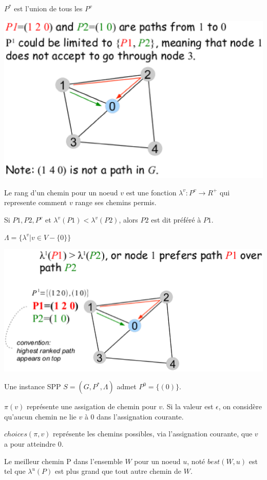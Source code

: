 \documentclass{report}
\begin{document}
$P^*$ est l'union de tous les $P^v$

\includegraphics[width=\textwidth]{sppex2.eps}

Le rang d'un chemin pour un noeud $v$ est une fonction $\lambda^v :
P^v \rightarrow R^+$ qui represente comment $v$ range ses chemins
permis.

Si $P1, P2, P^v$ et $\lambda^v(P1) < \lambda^v(P2)$, alors $P2$ est
dit préféré à $P1$.

$\Lambda = \{\lambda^v | v \in V-\{0\}\}$

\includegraphics[width=\textwidth]{sppex3.eps}

Une instance SPP $S = (G, P^*, \Lambda)$ admet $P^0=\{(0)\}$.

$\pi(v)$ représente une assigation de chemin pour $v$. Si la valeur
est $\epsilon$, on considère qu'aucun chemin ne lie $v$ à $0$ dans
l'assignation courante.

$choices(\pi, v)$ représente les chemins possibles, via l'assignation
courante, que $v$ a pour atteindre $0$.

Le meilleur chemin P dans l'ensemble $W$ pour un noeud $u$, noté
$best(W, u)$ est tel que $\lambda^u(P)$ est plus grand que tout autre
chemin de $W$.
\end{document}
